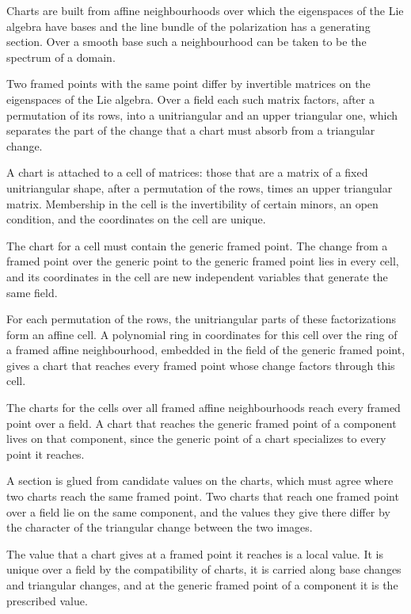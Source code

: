 Charts are built from affine neighbourhoods over which the eigenspaces of the Lie algebra have bases and the line
bundle of the polarization has a generating section. Over a smooth base such a neighbourhood can be taken to be the
spectrum of a domain.

Two framed points with the same point differ by invertible matrices on the eigenspaces of the Lie algebra. Over a
field each such matrix factors, after a permutation of its rows, into a unitriangular and an upper triangular
one, which separates the part of the change that a chart must absorb from a triangular change.

A chart is attached to a cell of matrices: those that are a matrix of a fixed unitriangular shape, after a
permutation of the rows, times an upper triangular matrix. Membership in the cell is the invertibility of certain
minors, an open condition, and the coordinates on the cell are unique.

The chart for a cell must contain the generic framed point. The change from a framed point over the generic point to
the generic framed point lies in every cell, and its coordinates in the cell are new independent variables that
generate the same field.

For each permutation of the rows, the unitriangular parts of these factorizations form an affine cell. A
polynomial ring in coordinates for this cell over the ring of a framed affine neighbourhood, embedded in the field
of the generic framed point, gives a chart that reaches every framed point whose change factors through this
cell.

The charts for the cells over all framed affine neighbourhoods reach every framed point over a field. A chart that
reaches the generic framed point of a component lives on that component, since the generic point of a chart
specializes to every point it reaches.

A section is glued from candidate values on the charts, which must agree where two charts reach the same framed
point. Two charts that reach one framed point over a field lie on the same component, and the values they give
there differ by the character of the triangular change between the two images.

The value that a chart gives at a framed point it reaches is a local value. It is unique over a field by the
compatibility of charts, it is carried along base changes and triangular changes, and at the generic framed point
of a component it is the prescribed value.

